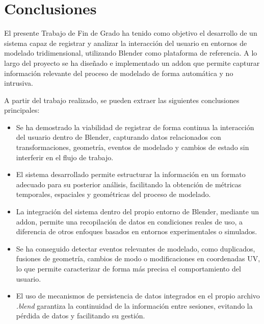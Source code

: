 
\section{Conclusiones}

El presente Trabajo de Fin de Grado ha tenido como objetivo el desarrollo de un sistema capaz de registrar y analizar la interacción del usuario en entornos de modelado tridimensional, utilizando Blender como plataforma de referencia. A lo largo del proyecto se ha diseñado e implementado un addon que permite capturar información relevante del proceso de modelado de forma automática y no intrusiva.

A partir del trabajo realizado, se pueden extraer las siguientes conclusiones principales:

\begin{itemize}

    \item Se ha demostrado la viabilidad de registrar de forma continua la interacción del usuario dentro de Blender, capturando datos relacionados con transformaciones, geometría, eventos de modelado y cambios de estado sin interferir en el flujo de trabajo.

    \item El sistema desarrollado permite estructurar la información en un formato adecuado para su posterior análisis, facilitando la obtención de métricas temporales, espaciales y geométricas del proceso de modelado.

    \item La integración del sistema dentro del propio entorno de Blender, mediante un addon, permite una recopilación de datos en condiciones reales de uso, a diferencia de otros enfoques basados en entornos experimentales o simulados.

    \item Se ha conseguido detectar eventos relevantes de modelado, como duplicados, fusiones de geometría, cambios de modo o modificaciones en coordenadas UV, lo que permite caracterizar de forma más precisa el comportamiento del usuario.

    \item El uso de mecanismos de persistencia de datos integrados en el propio archivo \textit{.blend} garantiza la continuidad de la información entre sesiones, evitando la pérdida de datos y facilitando su gestión.

\end{itemize}


